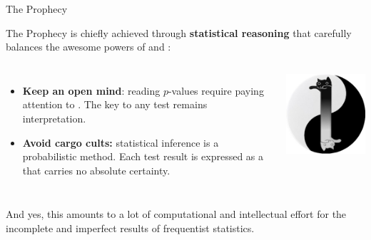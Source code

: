 \documentclass{beamer}
\begin{document}
	\begin{frame}[t]{The Prophecy}

	The Prophecy is chiefly achieved through \textbf{statistical reasoning} that carefully balances the awesome powers of  and :
	
	\begin{columns}[T]
		\begin{itemize}
 			\item \textbf{Keep an open mind}: reading $p$-values require paying attention to . The key to any test remains interpretation.

 			\item \textbf{Avoid cargo cults:} statistical inference is a probabilistic method. Each test result is expressed as a  that carries no absolute certainty.
		\end{itemize}
	\vspace{0em}
	\begin{flushright}
	\includegraphics[width=\textwidth]{images/longcat-tao.jpg}		
	\end{flushright}		
	\end{columns}
	
		\vspace{1em}
		And yes, this amounts to a lot of computational and intellectual effort for the incomplete and imperfect results of frequentist statistics.	
		
	\end{frame}
\end{document}
